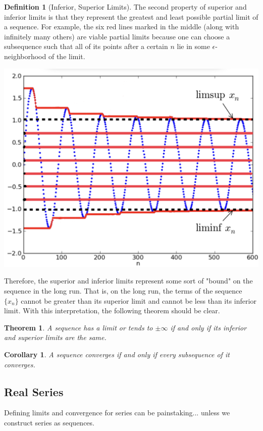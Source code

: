 \documentclass{article}
\newtheorem{theorem}{Theorem}[section]
\newtheorem{corollary}{Corollary}[theorem]
\theoremstyle{remark}
\theoremstyle{definition}
\newtheorem{definition}{Definition}[section]
\begin{document}
\begin{definition}[Inferior, Superior Limits]
The second property of superior and inferior limits is that they represent the greatest and least possible partial limit of a sequence. For example, the six red lines marked in the middle (along with infinitely many others) are viable partial limits because one can choose a subsequence such that all of its points after a certain $n$ lie in some $\epsilon$-neighborhood of the limit. 
\begin{center}
    \includegraphics[scale=0.12]{img/Sup_Inf_Limits_as_Limit_Bounds.jpeg}
\end{center}
Therefore, the superior and inferior limits represent some sort of "bound" on the sequence in the long run. That is, on the long run, the terms of the sequence $\{x_n\}$ cannot be greater than its superior limit and cannot be less than its inferior limit. With this interpretation, the following theorem should be clear. 
\end{definition}

\begin{theorem}
A sequence has a limit or tends to $\pm \infty$ if and only if its inferior and superior limits are the same. 
\end{theorem}

\begin{corollary}
A sequence converges if and only if every subsequence of it converges. 
\end{corollary}

\subsection{Real Series}
Defining limits and convergence for series can be painstaking... unless we construct series as sequences. 
\end{document}
